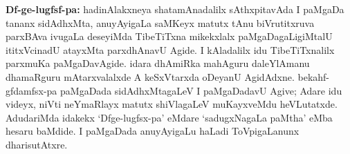 {\bf Df-ge-lugfsf-pa:} hadinAlakxneya shatamAnadalilx sAthxpitavAda I paMgaDa tananx sidAdhxMta, anuyAyigaLa saMKeyx matutx tAnu biVrutitxruva parxBAva ivugaLa deseyiMda TibeTiTxna mikekxlalx paMgaDagaLigiMtalU ititxVcinadU atayxMta parxdhAnavU Agide. I kAladalilx idu TibeTiTxnalilx parxmuKa paMgaDavAgide. idara dhAmiRka mahAguru daleYlAmanu dhamaRguru mAtarxvalalxde A keSxVtarxda oDeyanU AgidAdxne. bekahf-gfdamfsx-pa paMgaDada sidAdhxMtagaLeV I paMgaDadavU Agive; Adare idu videyx, niVti neYmaRlayx matutx shiVlagaLeV muKayxveMdu heVLutatxde. AdudariMda idakekx `Dfge-lugfsx-pa' eMdare `sadugxNagaLa paMtha' eMba hesaru baMdide. I paMgaDada anuyAyigaLu haLadi ToVpigaLanunx dharisutAtxre.

\theendnotes
{}

